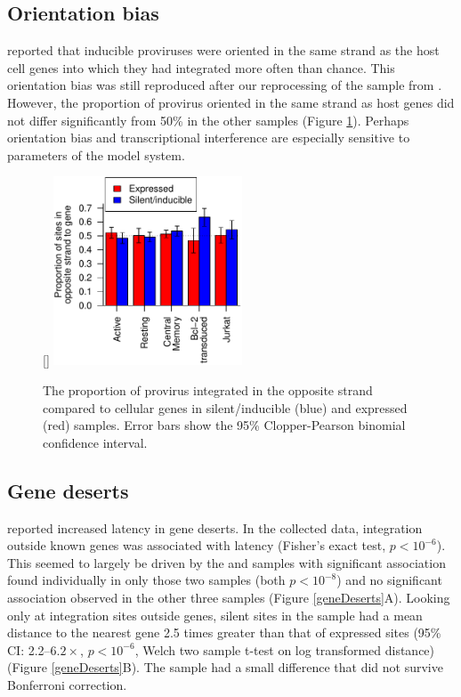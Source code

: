 \documentclass[../sherrill-Mix_thesis.tex]{subfiles}
\begin{document}
	\subsection{Orientation bias}
	\citet{Shan2011} reported that inducible proviruses were oriented in the same strand as the host cell genes into which they had integrated more often than chance. This orientation bias was still reproduced after our reprocessing of the \Bcl{} sample from  \citet{Shan2011}. However, the proportion of provirus oriented in the same strand as host genes did not differ significantly from 50\% in the other samples (Figure \ref{orient}). Perhaps orientation bias and transcriptional interference are especially sensitive to parameters of the model system.
	\begin{figure}
		\centering
			[\FBwidth]{
				\includegraphics[width=0.5\textwidth]{strandBias.pdf} %
			}{
				\caption[Strand orientation and latency]{The proportion of provirus integrated in the opposite strand compared to cellular genes in silent/inducible (blue) and expressed (red) samples. Error bars show the 95\% Clopper-Pearson binomial confidence interval.}
			}
		\label{orient}
	\end{figure}


	\subsection{Gene deserts}
	\citet{Lewinski2005} reported increased latency in gene deserts. In the collected data, integration outside known genes was associated with latency (Fisher's exact test, $p<10^{-6}$).  This seemed to largely be driven by the \Active{} and \Resting{} samples with significant association found individually in only those two samples (both $p<10^{-8}$) and no significant association observed in the other three samples (Figure \ref{geneDeserts}A). Looking only at integration sites outside genes, silent sites in the \Resting{} sample had a mean distance to the nearest gene 2.5 times greater than that of expressed sites (95\% CI: 2.2--$6.2\times$, $p<10^{-6}$, Welch two sample t-test on log transformed distance) (Figure \ref{geneDeserts}B). The \Active{} sample had a small difference that did not survive Bonferroni correction.
\end{document}
